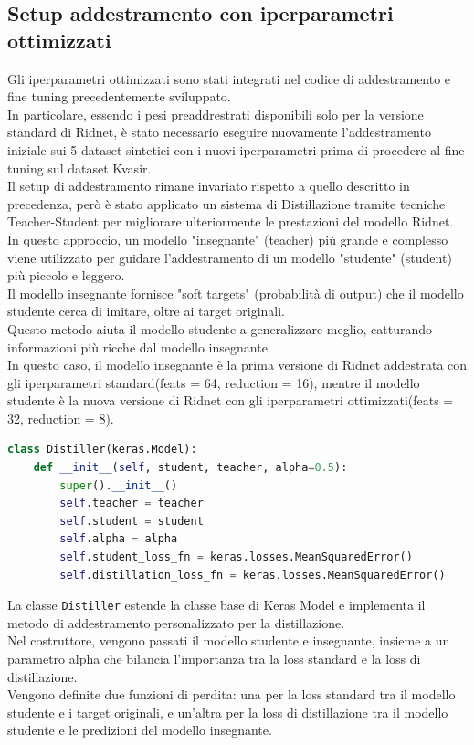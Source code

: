 \documentclass[12pt,a4paper,openright,twoside]{book}
\begin{document}
\subsection*{Setup addestramento con iperparametri ottimizzati}
Gli iperparametri ottimizzati sono stati integrati nel codice di addestramento e fine tuning precedentemente sviluppato.\\
In particolare, essendo i pesi preaddrestrati disponibili solo per la versione standard di Ridnet, è stato necessario eseguire nuovamente l'addestramento iniziale sui 5 dataset sintetici con i nuovi iperparametri prima di procedere al fine tuning sul dataset Kvasir.\\
Il setup di addestramento rimane invariato rispetto a quello descritto in precedenza, però è stato applicato un sistema di Distillazione tramite tecniche Teacher-Student per migliorare ulteriormente le prestazioni del modello Ridnet.\\
In questo approccio, un modello "insegnante" (teacher) più grande e complesso viene utilizzato per guidare l'addestramento di un modello "studente" (student) più piccolo e leggero.\\
Il modello insegnante fornisce "soft targets" (probabilità di output) che il modello studente cerca di imitare, oltre ai target originali.\\
Questo metodo aiuta il modello studente a generalizzare meglio, catturando informazioni più ricche dal modello insegnante.\\
In questo caso, il modello insegnante è la prima versione di Ridnet addestrata con gli iperparametri standard(feats = 64, reduction = 16), mentre il modello studente è la nuova versione di Ridnet con gli iperparametri ottimizzati(feats = 32, reduction = 8).\\

\begin{lstlisting}[language=Python, caption={Definizione della classe Distiller}, label={lst:distill_entrypoint}]
class Distiller(keras.Model):
    def __init__(self, student, teacher, alpha=0.5):
        super().__init__()
        self.teacher = teacher
        self.student = student
        self.alpha = alpha
        self.student_loss_fn = keras.losses.MeanSquaredError()
        self.distillation_loss_fn = keras.losses.MeanSquaredError()
\end{lstlisting}
La classe \texttt{Distiller} estende la classe base di Keras Model e implementa il metodo di addestramento personalizzato per la distillazione.\\
Nel costruttore, vengono passati il modello studente e insegnante, insieme a un parametro alpha che bilancia l'importanza tra la loss standard e la loss di distillazione.\\
Vengono definite due funzioni di perdita: una per la loss standard tra il modello studente e i target originali, e un'altra per la loss di distillazione tra il modello studente e le predizioni del modello insegnante.
\end{document}
